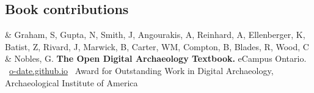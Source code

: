 \documentclass[11pt, a4paper]{article}
\newcommand{\LastName}{Batist}
\newcommand{\Initials}{Z}
\newcommand{\Me}{\LastName, \Initials}  %
\newcommand{\MichaelCarter}{Carter, WM}
\newcommand{\ShawnGraham}{Graham, S}
\newcommand{\NehaGupta}{Gupta, N}
\newcommand{\JoleneSmith}{Smith, J}
\newcommand{\AndreasAngourakis}{Angourakis, A}
\newcommand{\AndrewReinhard}{Reinhard, A}
\newcommand{\KateEllenberger}{Ellenberger, K}
\newcommand{\JoelRivard}{Rivard, J}
\newcommand{\BenMarwick}{Marwick, B}
\newcommand{\BethCompton}{Compton, B}
\newcommand{\RobBlades}{Blades, R}
\newcommand{\CristinaWood}{Wood, C}
\newcommand{\GaryNobles}{Nobles, G}
\newcommand{\JoeRoe}{Roe, J}
\newcommand{\Website}[1]{\newline \faGlobe\ \href{https://#1}{#1}}
\newcommand{\Preprint}[1]{\newline \faParagraph\ \href{https://doi.org/#1}{#1}}
\newcommand{\Note}[1]{\newline \faExclamationCircle\ {#1}}
\newcommand{\Year}[1]{\fontsize{10pt}{0}\selectfont #1}
\newcommand{\Progress}{In progress}
\begin{document}

\subsection{Book contributions}
\begin{EntriesTable}
\Year{2018}  &
  \ShawnGraham, \NehaGupta, \JoleneSmith, \AndreasAngourakis, \AndrewReinhard, \KateEllenberger, \Me, \JoelRivard, \BenMarwick, \MichaelCarter, \BethCompton, \RobBlades, \CristinaWood { \&} \GaryNobles.
  \textbf{The Open Digital Archaeology Textbook.}
  eCampus Ontario.
  \Website{o-date.github.io}\newline
  \ Award for Outstanding Work in Digital Archaeology, Archaeological Institute of America
\end{EntriesTable}
\end{document}
